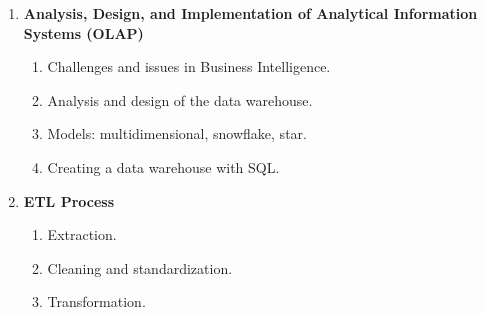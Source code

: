 \documentclass[12pt,a4paper]{article}
\begin{document}
\begin{enumerate}
\begin{enumerate}[label*=\arabic*.]
\begin{enumerate}[label*=\arabic*.]
            \item Entity–Relationship Model.
            \item Practical exercises.
        \end{enumerate}
        \item Logical Design:
        \begin{enumerate}[label*=\arabic*.]
            \item Relational Model.
            \item Normalization.
            \item Relational algebra.
        \end{enumerate}
        \item Physical Design.
        \item SQL:
        \begin{enumerate}[label*=\arabic*.]
            \item Data Definition Language (DDL).
            \item Data Control Language (DCL).
            \item Data Query Language (DQL).
            \item SQL query exercises.
            \item Codd's Twelve Rules.
            \item The relational and in-memory model as the best option for transactional systems.
        \end{enumerate}
    \end{enumerate}
    \item \textbf{Analysis, Design, and Implementation of Analytical Information Systems (OLAP)}
    \begin{enumerate}[label*=\arabic*.]
        \item Challenges and issues in Business Intelligence.
        \item Analysis and design of the data warehouse.
        \item Models: multidimensional, snowflake, star.
        \item Creating a data warehouse with SQL.
    \end{enumerate}
    \item \textbf{ETL Process}
    \begin{enumerate}[label*=\arabic*.]
        \item Extraction.
        \item Cleaning and standardization.
        \item Transformation.

\end{enumerate}
\end{enumerate}
\end{document}
